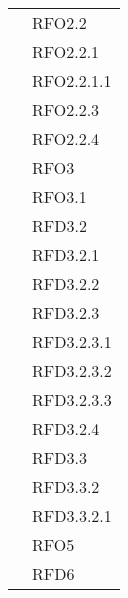 \begin{longtable}{|>{\centering}m{10cm}|m{3cm}<{\centering}|}
& RFO2.2\\
& RFO2.2.1\\
& RFO2.2.1.1\\
& RFO2.2.3\\
& RFO2.2.4\\
& RFO3\\
& RFO3.1\\
& RFD3.2\\
& RFD3.2.1\\
& RFD3.2.2\\
& RFD3.2.3\\
& RFD3.2.3.1\\
& RFD3.2.3.2\\
& RFD3.2.3.3\\
& RFD3.2.4\\
& RFD3.3\\
& RFD3.3.2\\
& RFD3.3.2.1\\
& RFO5\\
& RFD6\\ \hline


\end{longtable}
